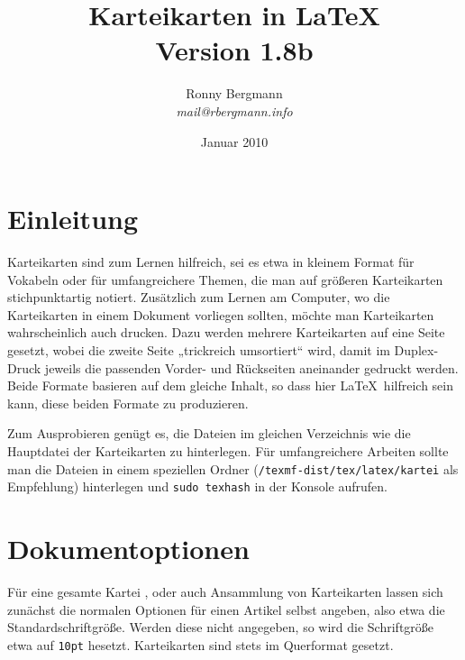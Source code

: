 \documentclass[a4paper,DIV=calc]{scrartcl}
\newcommand{\befehl}[1]{%
\marginpar{\footnotesize\textsf{#1}}%
}
\begin{document}
\title{Karteikarten in \LaTeX\\{\large Version 1.8b}}
\author{Ronny Bergmann\\\emph{mail@rbergmann.info}}
\date{Januar 2010}
\maketitle
\section{Einleitung}
Karteikarten sind zum Lernen hilfreich, sei es etwa in kleinem Format für Vokabeln oder für umfangreichere Themen, die man auf größeren Karteikarten stichpunktartig notiert. Zusätzlich zum Lernen am Computer, wo die Karteikarten in einem Dokument vorliegen sollten, möchte man Karteikarten wahrscheinlich auch drucken. Dazu werden mehrere Karteikarten auf eine Seite gesetzt, wobei die zweite Seite „trickreich umsortiert“ wird, damit im Duplex-Druck jeweils die passenden Vorder- und Rückseiten aneinander gedruckt werden. Beide Formate basieren auf dem gleiche Inhalt, so dass hier \LaTeX\ hilfreich sein kann, diese beiden Formate zu produzieren.

Zum Ausprobieren genügt es, die Dateien im gleichen Verzeichnis wie die Hauptdatei der Karteikarten zu hinterlegen. Für umfangreichere Arbeiten sollte man die Dateien in einem speziellen Ordner (\lstinline!/texmf-dist/tex/latex/kartei! als Empfehlung) hinterlegen und \lstinline!sudo texhash! in der Konsole aufrufen.

\section{Dokumentoptionen}
Für eine gesamte Kartei \befehl{\textbackslash document-\\class\{kartei\}}, oder auch Ansammlung von Karteikarten lassen sich zunächst die normalen Optionen für einen Artikel selbst angeben, also etwa die Standardschriftgröße. Werden diese nicht angegeben, so wird die Schriftgröße etwa auf \lstinline!10pt! hesetzt. Karteikarten sind stets im Querformat gesetzt.
\end{document}
